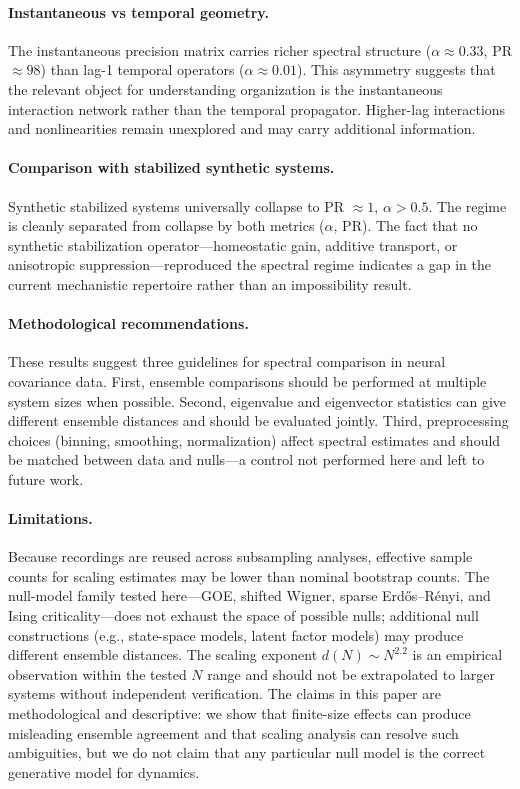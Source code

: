 \documentclass[aps,prf,reprint,twocolumn]{revtex4-2}
\newcommand{\mec}{\text{MEC}}
\begin{document}
\paragraph{Instantaneous vs temporal geometry.}
The instantaneous precision matrix carries richer spectral structure ($\alpha \approx 0.33$, PR $\approx 98$) than lag-1 temporal operators ($\alpha \approx 0.01$). This asymmetry suggests that the relevant object for understanding \mec{} organization is the instantaneous interaction network rather than the temporal propagator. Higher-lag interactions and nonlinearities remain unexplored and may carry additional information.

\paragraph{Comparison with stabilized synthetic systems.}
Synthetic stabilized systems universally collapse to PR $\approx 1$, $\alpha > 0.5$. The \mec{} regime is cleanly separated from collapse by both metrics ($\alpha$, PR). The fact that no synthetic stabilization operator---homeostatic gain, additive transport, or anisotropic suppression---reproduced the \mec{} spectral regime indicates a gap in the current mechanistic repertoire rather than an impossibility result.

\paragraph{Methodological recommendations.}
These results suggest three guidelines for spectral comparison in neural covariance data. First, ensemble comparisons should be performed at multiple system sizes when possible. Second, eigenvalue and eigenvector statistics can give different ensemble distances and should be evaluated jointly. Third, preprocessing choices (binning, smoothing, normalization) affect spectral estimates and should be matched between data and nulls---a control not performed here and left to future work.

\paragraph{Limitations.}
Because recordings are reused across subsampling analyses, effective sample counts for scaling estimates may be lower than nominal bootstrap counts. The null-model family tested here---GOE, shifted Wigner, sparse Erd\H{o}s--R\'{e}nyi, and Ising criticality---does not exhaust the space of possible nulls; additional null constructions (e.g., state-space models, latent factor models) may produce different ensemble distances. The scaling exponent $d(N) \sim N^{2.2}$ is an empirical observation within the tested $N$ range and should not be extrapolated to larger systems without independent verification. The claims in this paper are methodological and descriptive: we show that finite-size effects can produce misleading ensemble agreement and that scaling analysis can resolve such ambiguities, but we do not claim that any particular null model is the correct generative model for \mec{} dynamics.
\end{document}
